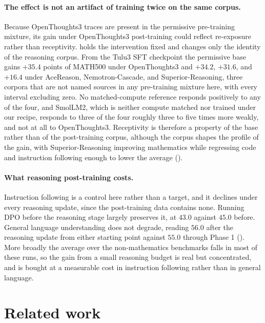 \documentclass{article}
\begin{document}


\paragraph{The effect is not an artifact of training twice on the same corpus.}
Because OpenThoughts3 traces are present in the permissive pre-training mixture, its gain under OpenThoughts3 post-training could reflect re-exposure rather than receptivity.  holds the intervention fixed and changes only the identity of the reasoning corpus. From the Tulu3 SFT checkpoint the permissive base gains $+35.4$ points of MATH500 under OpenThoughts3 and $+34.2$, $+31.6$, and $+16.4$ under AceReason, Nemotron-Cascade, and Superior-Reasoning, three corpora that are not named sources in any pre-training mixture here, with every interval excluding zero. No matched-compute reference responds positively to any of the four, and SmolLM2, which is neither compute matched nor trained under our recipe, responds to three of the four roughly three to five times more weakly, and not at all to OpenThoughts3. Receptivity is therefore a property of the base rather than of the post-training corpus, although the corpus shapes the profile of the gain, with Superior-Reasoning improving mathematics while regressing code and instruction following enough to lower the average ().



\paragraph{What reasoning post-training costs.}
Instruction following is a control here rather than a target, and it declines under every reasoning update, since the post-training data contains none. Running DPO before the reasoning stage largely preserves it, at $43.0$ against $45.0$ before. General language understanding does not degrade, reading $56.0$ after the reasoning update from either starting point against $55.0$ through Phase 1 (). More broadly the average over the non-mathematics benchmarks falls in most of these runs, so the gain from a small reasoning budget is real but concentrated, and is bought at a measurable cost in instruction following rather than in general language.

\section{Related work}
\label{sec:related_work}
\end{document}
